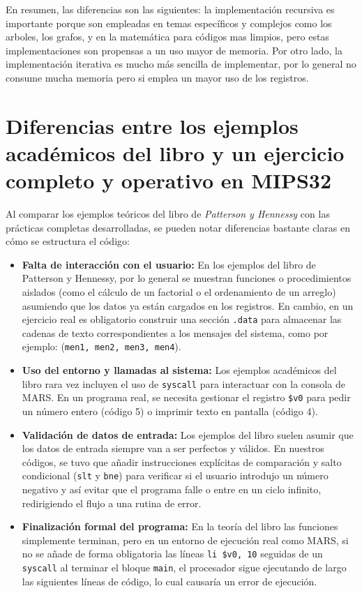 \documentclass[12pt, a4paper]{article}
\begin{document}
En resumen, las diferencias son las siguientes: la implementación recursiva es importante porque son empleadas en temas específicos y complejos como los arboles, los grafos, y en la matemática para códigos mas limpios, pero estas implementaciones son propensas a un uso mayor de memoria. Por otro lado, la implementación iterativa es mucho más sencilla de implementar, por lo general no consume mucha memoria pero si emplea un mayor uso de los registros.

\section{Diferencias entre los ejemplos académicos del libro y un ejercicio completo y operativo en MIPS32}

Al comparar los ejemplos teóricos del libro de \textit{Patterson y Hennessy} con las prácticas completas desarrolladas, se pueden notar diferencias bastante claras en cómo se estructura el código:

\begin{itemize}
    \item \textbf{Falta de interacción con el usuario:} En los ejemplos del libro de Patterson y Hennessy, por lo general se muestran funciones o procedimientos aislados (como el cálculo de un factorial o el ordenamiento de un arreglo) asumiendo que los datos ya están cargados en los registros. En cambio, en un ejercicio real es obligatorio construir una sección \lstinline|.data| para almacenar las cadenas de texto correspondientes a los mensajes del sistema, como por ejemplo: (\lstinline|men1, men2, men3, men4|).
    \item \textbf{Uso del entorno y llamadas al sistema:} Los ejemplos académicos del libro rara vez incluyen el uso de \lstinline|syscall| para interactuar con la consola de MARS. En un programa real, se necesita gestionar el registro \lstinline|$v0| para pedir un número entero (código 5) o imprimir texto en pantalla (código 4).
    \item \textbf{Validación de datos de entrada:} Los ejemplos del libro suelen asumir que los datos de entrada siempre van a ser perfectos y válidos. En nuestros códigos, se tuvo que añadir instrucciones explícitas de comparación y salto condicional (\lstinline|slt| y \lstinline|bne|) para verificar si el usuario introdujo un número negativo y así evitar que el programa falle o entre en un ciclo infinito, redirigiendo el flujo a una rutina de error.
    \item \textbf{Finalización formal del programa:} En la teoría del libro las funciones simplemente terminan, pero en un entorno de ejecución real como MARS, si no se añade de forma obligatoria las líneas \lstinline|li $v0, 10| seguidas de un \lstinline|syscall| al terminar el bloque \lstinline|main|, el procesador sigue ejecutando de largo las siguientes líneas de código, lo cual causaría un error de ejecución.
\end{itemize}
\end{document}
